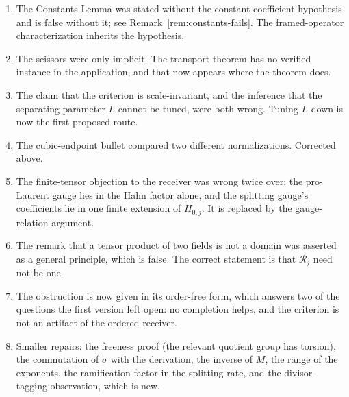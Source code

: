 \documentclass[11pt]{article}
\theoremstyle{definition}
\theoremstyle{remark}
\begin{document}
\begin{enumerate}
\item The Constants Lemma was stated without the constant-coefficient
  hypothesis and is false without it; see Remark~\textup{[rem:constants-fails]}. The
  framed-operator characterization inherits the hypothesis.
\item The scissors were only implicit. The transport theorem has no verified
  instance in the application, and that now appears where the theorem does.
\item The claim that the criterion is scale-invariant, and the inference that
  the separating parameter $L$ cannot be tuned, were both wrong. Tuning $L$ down
  is now the first proposed route.
\item The cubic-endpoint bullet compared two different normalizations. Corrected
  above.
\item The finite-tensor objection to the receiver was wrong twice over: the
  pro-Laurent gauge lies in the Hahn factor alone, and the splitting gauge's
  coefficients lie in one finite extension of $H_{0,j}$. It is replaced by the
  gauge-relation argument.
\item The remark that a tensor product of two fields is not a domain was
  asserted as a general principle, which is false. The correct statement is that
  $\mathscr R_j$ need not be one.
\item The obstruction is now given in its order-free form, which answers two of
  the questions the first version left open: no completion helps, and the
  criterion is not an artifact of the ordered receiver.
\item Smaller repairs: the freeness proof (the relevant quotient group has
  torsion), the commutation of $\sigma$ with the derivation, the inverse of $M$,
  the range of the exponents, the ramification factor in the splitting rate, and
  the divisor-tagging observation, which is new.
\end{enumerate}
\end{document}
